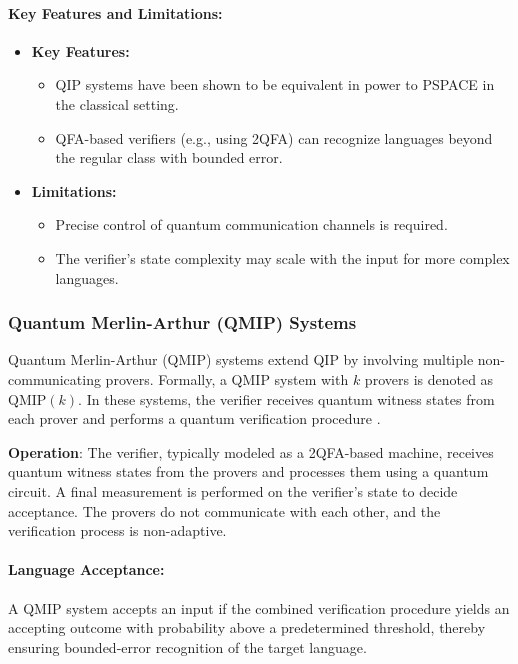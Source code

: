 \paragraph{Key Features and Limitations:}
\begin{itemize}
    \item \textbf{Key Features:}
    \begin{itemize}
        \item QIP systems have been shown to be equivalent in power to PSPACE in the classical setting.
        \item QFA-based verifiers (e.g., using 2QFA) can recognize languages beyond the regular class with bounded error.
    \end{itemize}
    \item \textbf{Limitations:}
    \begin{itemize}
        \item Precise control of quantum communication channels is required.
        \item The verifier’s state complexity may scale with the input for more complex languages.
    \end{itemize}
\end{itemize}

\subsubsection{Quantum Merlin-Arthur (QMIP) Systems}
\label{sssec:qmip}
\begin{definition}
Quantum Merlin-Arthur (QMIP) systems extend QIP by involving multiple non-communicating provers. Formally, a QMIP system with \( k \) provers is denoted as \(\text{QMIP}(k)\). In these systems, the verifier receives quantum witness states from each prover and performs a quantum verification procedure \cite{scegulnaja2010postselection, yamakami2014constant}.
\end{definition}

\textbf{Operation}:  
The verifier, typically modeled as a 2QFA-based machine, receives quantum witness states from the provers and processes them using a quantum circuit. A final measurement is performed on the verifier’s state to decide acceptance. The provers do not communicate with each other, and the verification process is non-adaptive.

\paragraph{Language Acceptance:}  
A QMIP system accepts an input if the combined verification procedure yields an accepting outcome with probability above a predetermined threshold, thereby ensuring bounded-error recognition of the target language.

